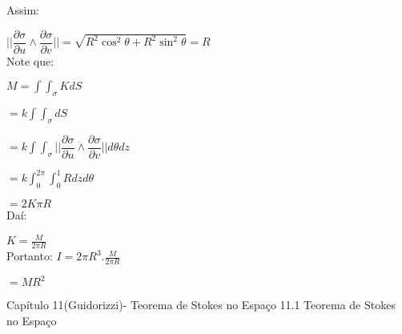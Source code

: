 \documentclass[11pt,a4paper]{article}
\newcommand{\integral}{\displaystyle\int}
\begin{document}
\begin{enumerate}
{    Assim:
    
    $\Bigg|\Bigg| \dfrac{\partial \sigma}{\partial u} \wedge\dfrac{\partial \sigma}{\partial v} \Bigg|\Bigg|
    =\sqrt{R^{2} \cos^{2}\theta +R^{2}\sin^{2}\theta} = R$\newline\\
    
    Note que:
    
    $M=\integral\integral_\sigma K dS$
    
    $=k \integral\integral_\sigma dS$
    
    $=k\integral\integral_\sigma \Bigg|\Bigg| \dfrac{\partial \sigma}{\partial u} \wedge\dfrac{\partial \sigma}{\partial v} \Bigg|\Bigg| d\theta dz$
    
    $=k\integral_0^{2\pi} \integral_0^1 Rdzd\theta $
    
    $=2K\pi R$
    \newline\\
    
    Daí:
    
    $K=\frac{M}{2\pi R}$\newline\\
    
    Portanto:
    $I=2\pi R^{3}.\frac{M}{2\pi R}$
    
    $=MR^{2}$





	\begin{center}
	\large Capítulo 11(Guidorizzi)- Teorema de Stokes no Espaço\newline
	\large 11.1 Teorema de Stokes no Espaço 
	\end{center}
	
}
\end{enumerate}
\end{document}
